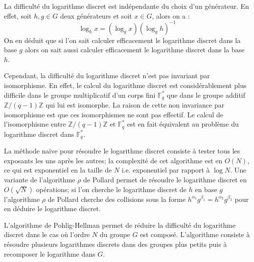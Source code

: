 \documentclass[a4paper]{article}
\theoremstyle{definition}
\theoremstyle{remark}
\numberwithin{equation}{section}
\begin{document}
La difficulté du logarithme discret est indépendante du choix d'un générateur. En effet, soit $h,g \in G$ deux générateurs et soit $x \in G$, alors on a :
$$\log_h x = (\log_g x)(\log_g h)^{-1}$$
On en déduit que si l'on sait calculer efficacement le logarithme discret dans la base $g$ alors on sait aussi calculer efficacement le logarithme discret dans la base $h$.

Cependant, la difficulté du logarithme discret n'est pas invariant par isomorphisme. En effet, le calcul du logarithme discret est considérablement plus difficile dans le groupe multiplicatif d'un corps fini $\mathbb{F}^*_q$ que dans le groupe additif $\mathbb{Z}/(q-1)\mathbb{Z}$ qui lui est isomorphe. La raison de cette non invariance par isomorphisme est que ces isomorphismes ne sont pas effectif. Le calcul de l'isomorphisme entre $\mathbb{Z}/(q-1)\mathbb{Z}$ et $\mathbb{F}^*_q$ est en fait équivalent au problème du logarithme discret dans $\mathbb{F}_q^*$.

La méthode naïve pour résoudre le logarithme discret consiste à tester tous les exposants les uns après les autres; la complexité de cet algorithme est en $O(N)$, ce qui est exponentiel en la taille de $N$ i.e. exponentiel par rapport à $\log N$. Une variante de l'algorithme $\rho$ de Pollard \cite{pollard} permet de résoudre le logarithme discret en $O(\sqrt{N})$ opérations; si l'on cherche le logarithme discret de $h$ en base $g$ l'algorithme $\rho$ de Pollard cherche des collisions sous la forme $h^{\alpha_1}g^{\beta_1} = h^{\alpha_2}g^{\beta_2}$ pour en déduire le logarithme discret.

L'algorithme de Pohlig-Hellman \cite{pohlig-hellman} permet de réduire la difficulté du logarithme discret dans le cas où l'ordre $N$ du groupe $G$ est composé. L'algorithme consiste à résoudre plusieurs logarithmes discrets dans des groupes plus petits puis à recomposer le logarithme dans $G$.
\end{document}
